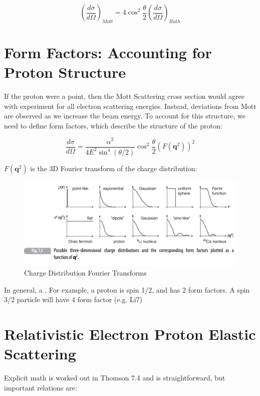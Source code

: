             \begin{equation}
                (\frac{d\sigma}{d\Omega})_{Mott} = 4\cos^2{\frac{\theta}{2}}(\frac{d\sigma}{d\Omega})_{Ruth}
            \end{equation}
    \section{Form Factors: Accounting for Proton Structure}
        \indent If the proton were a point, then the Mott Scattering cross section would agree with experiment for all electron scattering energies. Instead, deviations from Mott are observed as we increase the beam energy. To account for this structure, we need to define form factors, which describe the structure of the proton:
        
        \begin{equation}
            \frac{d\sigma}{d\Omega} = \frac{\alpha^2}{4E^2\sin^4{(\theta/2)}}\cos^2{\frac{\theta}{2}}(F(\textbf{q}^2))^2
        \end{equation}
        
        
        $F(\textbf{q}^2)$ is the 3D Fourier transform of the charge distribution: 
        
        \begin{figure}[H]
            \centering
            \includegraphics[width=14cm]{NuclearPhysics/modules/lepton-scattering/pics/elastic-ep/charge-dist.PNG}
            \caption{Charge Distribution Fourier Transforms}
        \end{figure}
        
        In general, a . For example, a proton is spin 1/2, and has 2 form factors. A spin 3/2 particle will have 4 form factor (e.g. Li7) 
        
    \section{Relativistic Electron Proton Elastic Scattering}
        \indent Explicit math is worked out in Thomson 7.4 and is straightforward, but important relations are:
        
